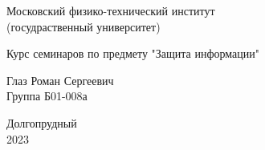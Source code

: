 


\begin{titlepage}

    \newpage
    \begin{center}
        \normalsize Московский физико-технический институт \\
                         (госудраственный университет)
    \end{center}

    \vspace{6em}

    \begin{center}
        \Large Курс семинаров по предмету "Защита информации"\\
        \articleTopic
    \end{center}

    \vspace{1em}

    \begin{center}
        \Large \textbf{\articleName}
    \end{center}

    \vspace{2em}

    \begin{center}
        \large Глаз Роман Сергеевич\\
               Группа Б01-008а
    \end{center}

    \vspace{\fill}

    \begin{center}
        Долгопрудный \\
            2023
    \end{center}

\end{titlepage}


    \pagestyle{fancy}
    \fancyhead{}
    \fancyfoot[C]{\thepage}
